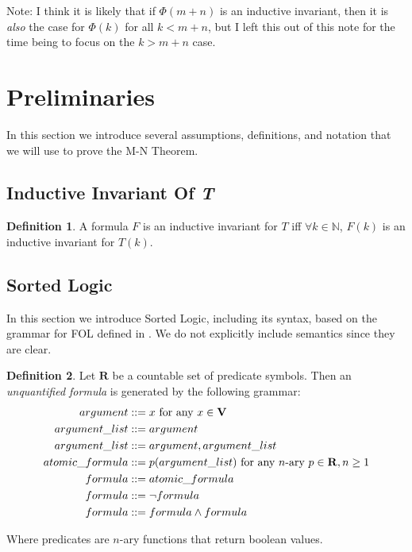 \documentclass[12pt]{article}
\theoremstyle{definition}
\newtheorem{definition}{Definition}
\theoremstyle{remark}
\begin{document}
Note: I think it is likely that if $\Phi(m+n)$ is an inductive invariant, then it is \textit{also} the case for $\Phi(k)$ for all $k<m+n$, but I left this out of this note for the time being to focus on the $k>m+n$ case.



\section{Preliminaries}
In this section we introduce several assumptions, definitions, and notation that we will use to prove the M-N Theorem.

\subsection{Inductive Invariant Of \textit{T}}
\begin{definition}
  A formula $F$ is an inductive invariant for $T$ iff $\forall k \in \mathbb{N}$, $F(k)$ is an inductive invariant for $T(k)$.
\end{definition}


\subsection{Sorted Logic}
In this section we introduce Sorted Logic, including its syntax, based on the grammar for FOL defined in \cite{ben-ari}.  We do not explicitly include semantics since they are clear.

\begin{definition}
  Let $\mathbf{R}$ be a countable set of predicate symbols.  Then an \textit{unquantified formula} is generated by the following grammar:
  \begin{align*}
    argument &::= x \hfill \text{ for any } x \in \mathbf{V}\\
    argument\_list &::= argument\\
    argument\_list &::= argument,argument\_list\\
    atomic\_formula &::= p(argument\_list) \hfill \text{ for any } n\text{-ary } p \in \mathbf{R}, n \geq 1\\
    formula &::= atomic\_formula\\
    formula &::= \neg formula\\
    formula &::= formula \land formula\\
  \end{align*}

  Where predicates are $n$-ary functions that return boolean values.
\end{definition}
\end{document}
